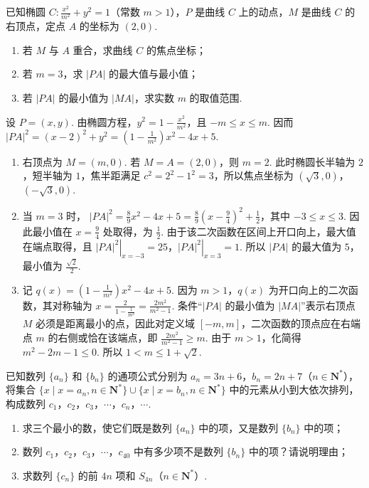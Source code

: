 \begin{problem}
已知椭圆 \(C: \frac{x^2}{m^2} + y^{2} = 1\)（常数 \(m > 1\)），\(P\) 是曲线 \(C\) 上的动点，\(M\) 是曲线 \(C\) 的右顶点，定点 \(A\) 的坐标为 \((2,0)\).
\begin{enumerate}
\item 若 \(M\) 与 \(A\) 重合，求曲线 \(C\) 的焦点坐标；
\item 若 \(m = 3\)，求 \(|PA|\) 的最大值与最小值；
\item 若 \(|PA|\) 的最小值为 \(|MA|\)，求实数 \(m\) 的取值范围.
\end{enumerate}
\end{problem}

\begin{solution}
设 \(P=(x,y)\). 由椭圆方程，\(y^2=1-\frac{x^2}{m^2}\)，且 \(-m\leqslant x\leqslant m\). 因而
\(|PA|^2=(x-2)^2+y^2=\left(1-\frac1{m^2}\right)x^2-4x+5\).

\begin{enumerate}
\item 右顶点为 \(M=(m,0)\). 若 \(M=A=(2,0)\)，则 \(m=2\). 此时椭圆长半轴为 \(2\)，短半轴为 \(1\)，焦半距满足 \(c^2=2^2-1^2=3\)，所以焦点坐标为 \((\sqrt3,0)\)，\((-\sqrt3,0)\).

\item 当 \(m=3\) 时，
\(|PA|^2=\frac89x^2-4x+5=\frac89\left(x-\frac94\right)^2+\frac12\)，其中 \(-3\leqslant x\leqslant3\). 因此最小值在 \(x=\frac94\) 处取得，为 \(\frac12\). 由于该二次函数在区间上开口向上，最大值在端点取得，且
\(\left.|PA|^2\right|_{x=-3}=25\)，\(\left.|PA|^2\right|_{x=3}=1\). 所以 \(|PA|\) 的最大值为 \(5\)，最小值为 \(\frac{\sqrt2}{2}\).

\item 记 \(q(x)=\left(1-\frac1{m^2}\right)x^2-4x+5\). 因为 \(m>1\)，\(q(x)\) 为开口向上的二次函数，其对称轴为
\(x=\frac{2}{1-\frac{1}{m^2}}=\frac{2m^2}{m^2-1}\). 条件“\(|PA|\) 的最小值为 \(|MA|\)”表示右顶点 \(M\) 必须是距离最小的点，因此对定义域 \([-m,m]\)，二次函数的顶点应在右端点 \(m\) 的右侧或恰在该端点，即
\(\frac{2m^2}{m^2-1}\geqslant m\). 由于 \(m>1\)，化简得
\(m^2-2m-1\leqslant0\). 所以 \(1<m\leqslant1+\sqrt2\).
\end{enumerate}
\end{solution}

\begin{problem}
已知数列 \(\{a_{n}\}\) 和 \(\{b_{n}\}\) 的通项公式分别为 \(a_{n} = 3n + 6\)，\(b_{n} = 2n + 7\)（\(n \in \mathbf{N}^{*}\)），将集合 \(\{x \mid x = a_{n}, n \in \mathbf{N}^{*}\} \cup \{x \mid x = b_{n}, n \in \mathbf{N}^{*}\}\) 中的元素从小到大依次排列，构成数列 \(c_{1}\)，\(c_{2}\)，\(c_{3}\)，\(\cdots\)，\(c_{n}\)，\(\cdots\).
\begin{enumerate}
\item 求三个最小的数，使它们既是数列 \(\{a_{n}\}\) 中的项，又是数列 \(\{b_{n}\}\) 中的项；
\item 数列 \(c_{1}\)，\(c_{2}\)，\(c_{3}\)，\(\cdots\)，\(c_{40}\) 中有多少项不是数列 \(\{b_{n}\}\) 中的项？请说明理由；
\item 求数列 \(\{c_{n}\}\) 的前 \(4n\) 项和 \(S_{4n}\)（\(n \in \mathbf{N}^{*}\)）.
\end{enumerate}
\end{problem}


